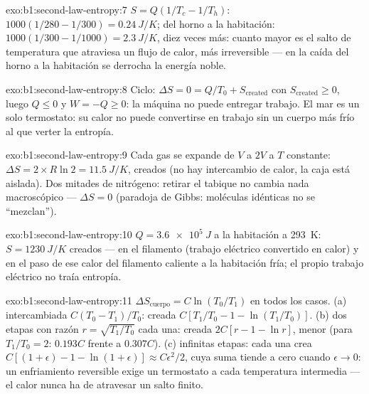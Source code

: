 \begin{solution}{exo:b1:second-law-entropy:7}
$S = Q(1/T_c - 1/T_h)$: $1000(1/280 - 1/300) = \qty{0.24}{J/K}$; del horno a
la habitación: $1000(1/300 - 1/1000) = \qty{2.3}{J/K}$, diez veces más: cuanto
mayor es el salto de temperatura que atraviesa un flujo de calor, más
irreversible --- en la caída del horno a la habitación se derrocha la energía noble.
\end{solution}

\begin{solution}{exo:b1:second-law-entropy:8}
Ciclo: $\Delta S = 0 = Q/T_0 + S_{\mathrm{created}}$ con $S_{\mathrm{created}} \geq 0$,
luego $Q \leq 0$ y $W = -Q \geq 0$: la máquina no puede entregar trabajo. El
mar es un solo termostato: su calor no puede convertirse en trabajo sin un
cuerpo más frío al que verter la entropía.
\end{solution}

\begin{solution}{exo:b1:second-law-entropy:9}
Cada gas se expande de $V$ a $2V$ a $T$ constante: $\Delta S = 2 \times R\ln2
= \qty{11.5}{J/K}$, creados (no hay intercambio de calor, la caja está
aislada). Dos mitades de nitrógeno: retirar el tabique no cambia nada
macroscópico --- $\Delta S = 0$ (paradoja de Gibbs: moléculas idénticas no se ``mezclan'').
\end{solution}

\begin{solution}{exo:b1:second-law-entropy:10}
$Q = \qty{3.6e5}{J}$ a la habitación a \qty{293}{K}: $S = \qty{1230}{J/K}$
creados --- en el filamento (trabajo eléctrico convertido en calor) y en el
paso de ese calor del filamento caliente a la habitación fría; el propio
trabajo eléctrico no traía entropía.
\end{solution}

\begin{solution}{exo:b1:second-law-entropy:11}
$\Delta S_{\text{cuerpo}} = C\ln(T_0/T_1)$ en todos los casos. (a) intercambiada
$C(T_0 - T_1)/T_0$: creada $C[T_1/T_0 - 1 - \ln(T_1/T_0)]$. (b) dos etapas
con razón $r = \sqrt{T_1/T_0}$ cada una: creada $2C[r - 1 - \ln r]$, menor
(para $T_1/T_0 = 2$: $0.193C$ frente a $0.307C$). (c) infinitas etapas:
cada una crea $C[(1 + \epsilon) - 1 - \ln(1 + \epsilon)] \approx C\epsilon^2/2$,
cuya suma tiende a cero cuando $\epsilon \to 0$: un enfriamiento reversible
exige un termostato a cada temperatura intermedia --- el calor nunca ha de atravesar un salto finito.
\end{solution}

